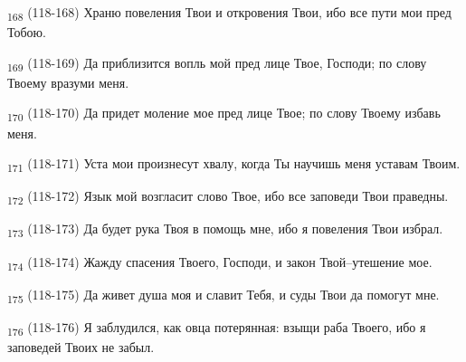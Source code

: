 \begin{tcolorbox}
\textsubscript{168} (118-168) Храню повеления Твои и откровения Твои, ибо все пути мои пред Тобою.
\end{tcolorbox}
\begin{tcolorbox}
\textsubscript{169} (118-169) Да приблизится вопль мой пред лице Твое, Господи; по слову Твоему вразуми меня.
\end{tcolorbox}
\begin{tcolorbox}
\textsubscript{170} (118-170) Да придет моление мое пред лице Твое; по слову Твоему избавь меня.
\end{tcolorbox}
\begin{tcolorbox}
\textsubscript{171} (118-171) Уста мои произнесут хвалу, когда Ты научишь меня уставам Твоим.
\end{tcolorbox}
\begin{tcolorbox}
\textsubscript{172} (118-172) Язык мой возгласит слово Твое, ибо все заповеди Твои праведны.
\end{tcolorbox}
\begin{tcolorbox}
\textsubscript{173} (118-173) Да будет рука Твоя в помощь мне, ибо я повеления Твои избрал.
\end{tcolorbox}
\begin{tcolorbox}
\textsubscript{174} (118-174) Жажду спасения Твоего, Господи, и закон Твой--утешение мое.
\end{tcolorbox}
\begin{tcolorbox}
\textsubscript{175} (118-175) Да живет душа моя и славит Тебя, и суды Твои да помогут мне.
\end{tcolorbox}
\begin{tcolorbox}
\textsubscript{176} (118-176) Я заблудился, как овца потерянная: взыщи раба Твоего, ибо я заповедей Твоих не забыл.
\end{tcolorbox}
